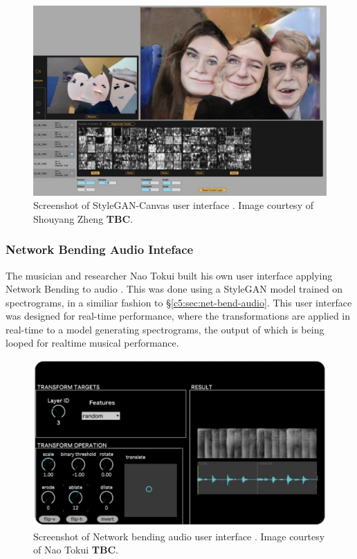 \begin{figure}[!htb]
    \centering
    \captionsetup{justification=centering}
    \includegraphics[width=1\textwidth]{figures/c7_impact/net-bend-technical/stylegan-canvas.png}
    \caption[StyleGAN-Canvas user interface]{Screenshot of StyleGAN-Canvas user interface \citep{zheng2023stylegan}. Image courtesy of Shouyang Zheng \textbf{TBC}.}
    \label{fig:c7:stylegan-canvas}
\end{figure}

\subsubsection{Network Bending Audio Inteface}

The musician and researcher Nao Tokui built his own user interface applying Network Bending to audio \cite{tokui2023bending}. 
This was done using a StyleGAN model trained on spectrograms, in a similiar fashion to \S \ref{c5:sec:net-bend-audio}.
This user interface was designed for real-time performance, where the transformations are applied in real-time to a model generating spectrograms, the output of which is being looped for realtime musical performance.

\begin{figure}[!htb]
    \centering
    \captionsetup{justification=centering}
    \includegraphics[width=1\textwidth]{figures/c7_impact/net-bend-technical/nao-tokui-stylegan-audio.png}
    \caption[Network bending audio user interface]{Screenshot of Network bending audio user interface \citep{tokui2023bending}. Image courtesy of Nao Tokui \textbf{TBC}.}
    \label{fig:c7:stylegan-canvas}
\end{figure}

